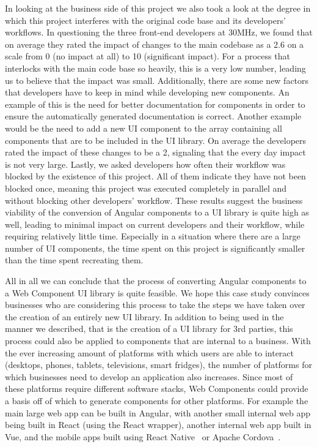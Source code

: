 In looking at the business side of this project we also took a look at the degree in which this project interferes with the original code base and its developers' workflows. In questioning the three front-end developers at 30MHz, we found that on average they rated the impact of changes to the main codebase as a 2.6 on a scale from 0 (no impact at all) to 10 (significant impact). For a process that interlocks with the main code base so heavily, this is a very low number, leading us to believe that the impact was small. Additionally, there are some new factors that developers have to keep in mind while developing new components. An example of this is the need for better documentation for components in order to ensure the automatically generated documentation is correct. Another example would be the need to add a new UI component to the array containing all components that are to be included in the UI library. On average the developers rated the impact of these changes to be a 2, signaling that the every day impact is not very large. Lastly, we asked developers how often their workflow was blocked by the existence of this project. All of them indicate they have not been blocked once, meaning this project was executed completely in parallel and without blocking other developers' workflow. These results suggest the business viability of the conversion of Angular components to a UI library is quite high as well, leading to minimal impact on current developers and their workflow, while requiring relatively little time. Especially in a situation where there are a large number of UI components, the time spent on this project is significantly smaller than the time spent recreating them.

All in all we can conclude that the process of converting Angular components to a Web Component UI library is quite feasible. We hope this case study convinces businesses who are considering this process to take the steps we have taken over the creation of an entirely new UI library. In addition to being used in the manner we described, that is the creation of a UI library for 3rd parties, this process could also be applied to components that are internal to a business. With the ever increasing amount of platforms with which users are able to interact (desktops, phones, tablets, televisions, smart fridges), the number of platforms for which businesses need to develop an application also increases. Since most of these platforms require different software stacks, Web Components could provide a basis off of which to generate components for other platforms. For example the main large web app can be built in Angular, with another small internal web app being built in React (using the React wrapper), another internal web app built in Vue, and the mobile apps built using React Native~ or Apache Cordova~.

